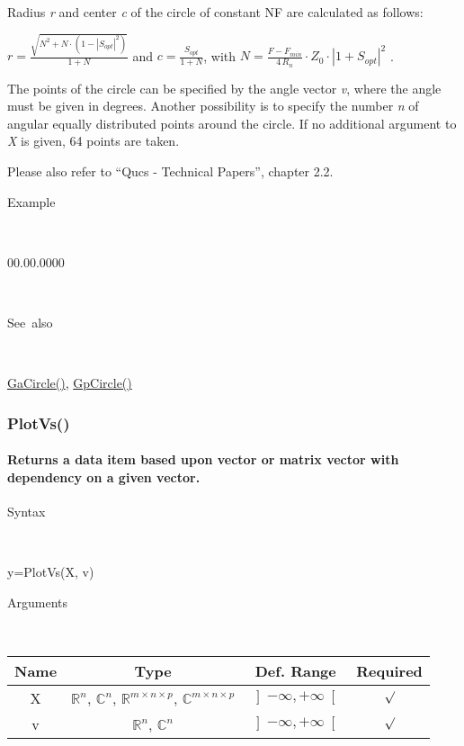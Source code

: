 \noindent Radius \textit{r} and center \textit{c} of the circle of
constant NF are calculated as follows:

\medskip{}
\noindent $r=\frac{{\displaystyle \sqrt{N^{2}+N\cdot\left(1-\left|S_{opt}\right|^{2}\right)}}}{{\displaystyle 1+N}}$
and $c={\displaystyle \frac{S_{opt}}{1+N}}$, with $N={\displaystyle \frac{F-F_{min}}{4\, R_{n}}}\cdot Z_{0}\cdot\left|1+S_{opt}\right|^{2}$
.
\medskip{}

\noindent The points of the circle can be specified by the angle vector
\textit{v}, where the angle must be given in degrees. Another possibility
is to specify the number \textit{n} of angular equally distributed
points around the circle. If no additional argument to \textit{X}
is given, 64 points are taken.

\noindent Please also refer to {}``Qucs - Technical Papers'', chapter
2.2.

\begin{description}
\item [Example]~
\end{description}
\begin{lyxlist}{00.00.0000}
\item [\texttt{v=NoiseCircle(Sopt,Fmin,Rn,F)}]~
\end{lyxlist}
\begin{description}
\item [See~also]~
\end{description}
\textcolor{blue}{\hyperlink{GaCircle}{GaCircle()}}\textcolor{black}{,}
\textcolor{blue}{\hyperlink{GpCircle}{GpCircle()}}


\newpage
\subsubsection*{\hypertarget{PlotVs}{}{\Large PlotVs()}}


\paragraph{\label{par:PlotVs}Returns a data item based upon vector or matrix
vector with dependency on a given vector.}

\begin{description}
\item [Syntax]~
\end{description}
y=PlotVs(X, v)

\begin{description}
\item [Arguments]~
\end{description}
\begin{tabular}{|c|c|c|c|}
\hline 
Name&
Type&
Def. Range&
Required\tabularnewline
\hline
\hline 
X&
$\mathbb{R}^{n}$, $\mathbb{C}^{n}$, $\mathbb{R}^{m\times n\times p}$,
$\mathbb{C}^{m\times n\times p}$&
$\left]-\infty,+\infty\right[$&
$\surd$\tabularnewline
\hline
v&
$\mathbb{R}^{n}$, $\mathbb{C}^{n}$&
$\left]-\infty,+\infty\right[$&
$\surd$\tabularnewline
\hline
\end{tabular}

